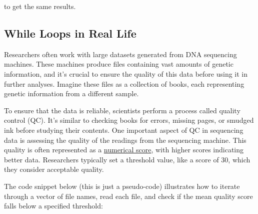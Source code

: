 \documentclass[
]{book}
\begin{document}
to get the same results.

\hypertarget{while-loops-in-real-life}{%
\subsection{While Loops in Real Life}\label{while-loops-in-real-life}}

Researchers often work with large datasets generated from DNA sequencing machines. These machines produce files containing vast amounts of genetic information, and it's crucial to ensure the quality of this data before using it in further analyses. Imagine these files as a collection of books, each representing genetic information from a different sample.

To ensure that the data is reliable, scientists perform a process called quality control (QC). It's similar to checking books for errors, missing pages, or smudged ink before studying their contents. One important aspect of QC in sequencing data is assessing the quality of the readings from the sequencing machine. This quality is often represented as a \href{https://en.wikipedia.org/wiki/Phred_quality_score}{numerical score}, with higher scores indicating better data. Researchers typically set a threshold value, like a score of 30, which they consider acceptable quality.

The code snippet below (this is just a pseudo-code) illustrates how to iterate through a vector of file names, read each file, and check if the mean quality score falls below a specified threshold:
\end{document}
